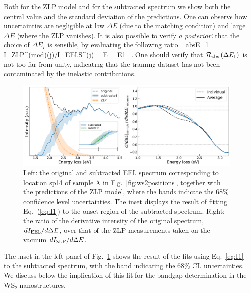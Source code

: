   
  
Both for the ZLP model and for the subtracted spectrum we show both the central value
and the standard deviation of the predictions.
%
One can observe how uncertainties are negligible at low $\Delta E$
(due to the matching condition) and large $\Delta E$ (where the ZLP vanishes).
%
It is also possible to verify {\it a posteriori} that the choice of $\Delta E_I$
is sensible, by evaluating the following ratio
\be
{}_{\rm abs}\lp \Delta E_1\rp \equiv 
\la I_{\rm ZLP}^{({\rm mod})(j)}\ra /I_{\rm EELS}^{(j)} \Big|_{\Delta E = \Delta E1} \, .
\ee
One should verify that $\mathcal{R}_{\rm abs}\left( \Delta E_1\right)$ is not too far from unity,
indicating that the training dataset has not been contaminated by the inelastic contributions.
     
\begin{figure}[t]
\begin{centering}
  \includegraphics[width=0.99\linewidth]{plots/SubtractedEELS_plot_sp14.pdf}
   \caption{Left: the original
     and subtracted EEL spectrum corresponding to location sp14 of sample A in Fig.~\ref{fig:ws2positions},
     together with the predictions of the ZLP model, where
     the bands indicate the 68\% confidence level uncertainties.
     The inset displays the result of fitting Eq.~(\ref{eq:I1}) to the onset
     region of the subtracted spectrum.
     Right: the ratio of the derivative intensity of the original spectrum, $dI_{\rm EEL}/d\Delta E$,
     over that of the ZLP measurements taken on the vacuum $d I_{\rm ZLP}/d\Delta E$.
  }
\label{fig:sp4_subtracted_spectrum}
\end{centering}
\end{figure}

The inset in the left panel of Fig.~\ref{fig:sp4_subtracted_spectrum}
shows the result of the  fits using Eq.~\ref{eq:I1} to the subtracted spectrum,
with the band indicating the 68\% CL uncertainties.
%
We discuss below the implication of this fit for the bandgap determination
in the WS$_2$ nanostructures.

